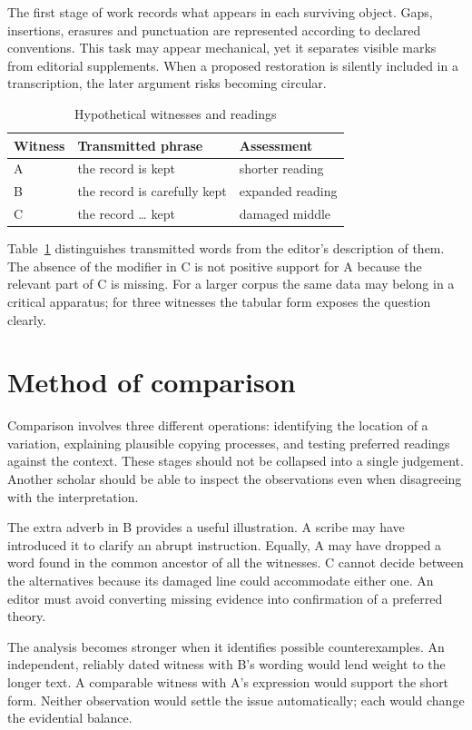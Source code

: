 \documentclass{impeart}
\begin{document}
The first stage of work records what appears in each surviving object.
Gaps, insertions, erasures and punctuation are represented according to
declared conventions. This task may appear mechanical, yet it separates
visible marks from editorial supplements. When a proposed restoration
is silently included in a transcription, the later argument risks
becoming circular.

\begin{table}[htbp]
  \centering
  \caption{Hypothetical witnesses and readings}\label{tab:witnesses}
  \begin{tabular}{lll}
    \toprule
    Witness & Transmitted phrase & Assessment \\
    \midrule
    A & the record is kept & shorter reading \\
    B & the record is carefully kept & expanded reading \\
    C & the record \ldots{} kept & damaged middle \\
    \bottomrule
  \end{tabular}
\end{table}

Table~\ref{tab:witnesses} distinguishes transmitted words from the
editor's description of them. The absence of the modifier in C is
not positive support for A because the relevant part of C is missing.
For a larger corpus the same data may belong in a critical apparatus;
for three witnesses the tabular form exposes the question clearly.

\section{Method of comparison}\label{sec:method}
Comparison involves three different operations: identifying the location
of a variation, explaining plausible copying processes, and testing
preferred readings against the context. These stages should not be
collapsed into a single judgement. Another scholar should be able to
inspect the observations even when disagreeing with the interpretation.

The extra adverb in B provides a useful illustration. A scribe may
have introduced it to clarify an abrupt instruction. Equally, A may
have dropped a word found in the common ancestor of all the witnesses.
C cannot decide between the alternatives because its damaged line
could accommodate either one. An editor must avoid converting missing
evidence into confirmation of a preferred theory.

The analysis becomes stronger when it identifies possible counterexamples.
An independent, reliably dated witness with B's wording would lend
weight to the longer text. A comparable witness with A's expression
would support the short form. Neither observation would settle the
issue automatically; each would change the evidential balance.
\end{document}

